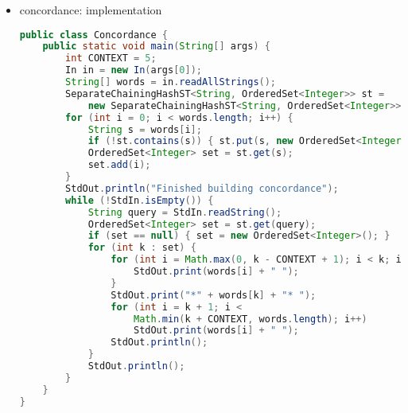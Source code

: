 \documentclass[8pt,a4paper,compress]{beamer}
\begin{document}
\begin{frame}[fragile]
\begin{itemize}
\item concordance: implementation

\begin{lstlisting}[language=Java]
public class Concordance {
    public static void main(String[] args) {
        int CONTEXT = 5;
        In in = new In(args[0]);
        String[] words = in.readAllStrings();
        SeparateChainingHashST<String, OrderedSet<Integer>> st = 
            new SeparateChainingHashST<String, OrderedSet<Integer>>();
        for (int i = 0; i < words.length; i++) {
            String s = words[i];
            if (!st.contains(s)) { st.put(s, new OrderedSet<Integer>()); }
            OrderedSet<Integer> set = st.get(s);
            set.add(i);
        }
        StdOut.println("Finished building concordance");
        while (!StdIn.isEmpty()) {
            String query = StdIn.readString();
            OrderedSet<Integer> set = st.get(query);
            if (set == null) { set = new OrderedSet<Integer>(); }
            for (int k : set) {
                for (int i = Math.max(0, k - CONTEXT + 1); i < k; i++) {
                    StdOut.print(words[i] + " ");
                }
                StdOut.print("*" + words[k] + "* ");
                for (int i = k + 1; i < 
                    Math.min(k + CONTEXT, words.length); i++)
                    StdOut.print(words[i] + " ");
                StdOut.println();
            }
            StdOut.println();
        }  
    }
}
\end{lstlisting}
\end{itemize}
\end{frame}
\end{document}
